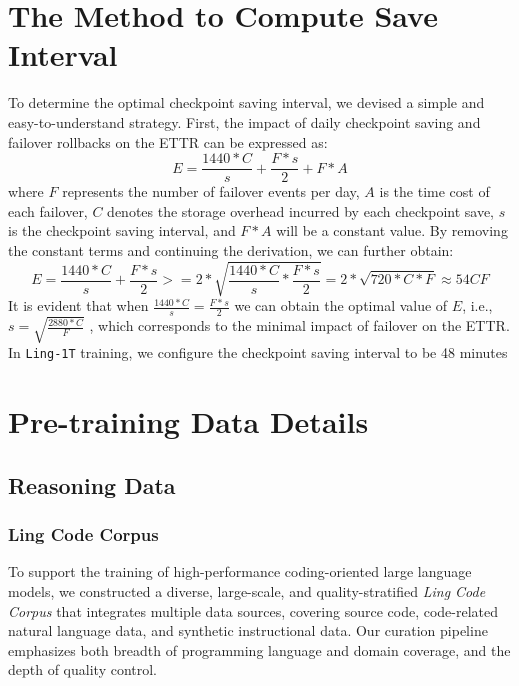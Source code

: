 \appendix


\section{The Method to Compute Save Interval}\label{app:save_interval}
To determine the optimal checkpoint saving interval, we devised a simple and easy-to-understand strategy. First, the impact of daily checkpoint saving and failover rollbacks on the ETTR can be expressed as:
\begin{equation}
    E = \frac{1440 * C}{s} + \frac{F * s}{2} + F * A
\end{equation}
where $F$ represents the number of failover events per day, $A$ is the time cost of each failover, $C$ denotes the storage overhead incurred by each checkpoint save, $s$ is the checkpoint saving interval, and $F * A$ will be a constant value.
By removing the constant terms and continuing the derivation, we can further obtain:
\begin{equation}
    E = \frac{1440 * C}{s} + \frac{F*s}{2} >= 2*\sqrt{\frac{1440 * C}{s} * \frac{F*s}{2}} = 2* \sqrt{720*C*F} \approx 54CF
\end{equation}
It is evident that when $\frac{1440 * C}{s} = \frac{F*s}{2}$ we can obtain the optimal value of $E$, i.e., $s = \sqrt{\frac{2880*C}{F}}$ , which corresponds to the minimal impact of failover on the ETTR. In \texttt{Ling-1T} training, we configure the checkpoint saving interval to be 48 minutes


\section{Pre-training Data Details}
\subsection{Reasoning Data}
\subsubsection{Ling Code Corpus}\label{appendix:coder}
To support the training of high-performance coding-oriented large language models, we constructed a diverse, large-scale, and quality-stratified \emph{Ling Code Corpus} that integrates multiple data sources, covering source code, code-related natural language data, and synthetic instructional data. 
Our curation pipeline emphasizes both breadth of programming language and domain coverage, and the depth of quality control.

